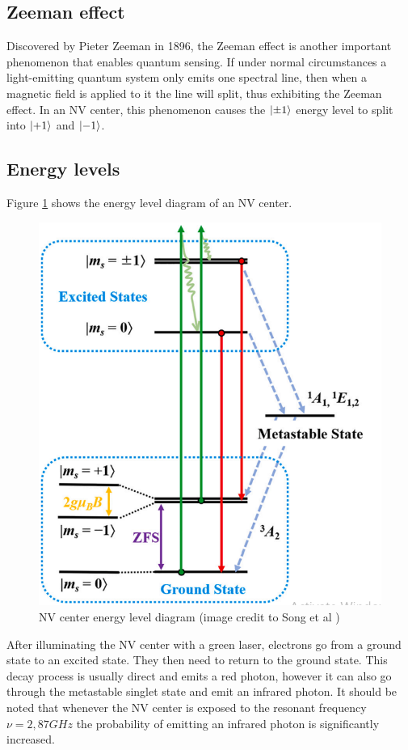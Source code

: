 \subsection{Zeeman effect}
Discovered by Pieter Zeeman in 1896, the Zeeman effect is another important phenomenon that enables quantum sensing. If under normal circumstances a light-emitting quantum system only emits one spectral line, then when a magnetic field is applied to it the line will split, thus exhibiting the Zeeman effect. In an NV center, this phenomenon causes the $\ket{\pm1}$ energy level to split into $\ket{+1}$ and $\ket{-1}$. 

\subsection{Energy levels}\label{chap:energy_levels}
Figure \ref{fig:energylevels} shows the energy level diagram of an NV center.

\begin{figure}[ht]
	\centering
	\includegraphics[width=0.7\linewidth]{img/energy_levels}
	\caption{NV center energy level diagram (image credit to Song et al \cite{song2024enhancing})}
	\label{fig:energylevels}
\end{figure}

After illuminating the NV center with a green laser, electrons go from a ground state to an excited state. They then need to return to the ground state. This decay process is usually direct and emits a red photon, however it can also go through the metastable singlet state and emit an infrared photon. It should be noted that whenever the NV center is exposed to the resonant frequency $\nu = 2,87 GHz$ the probability of emitting an infrared photon is significantly increased.



